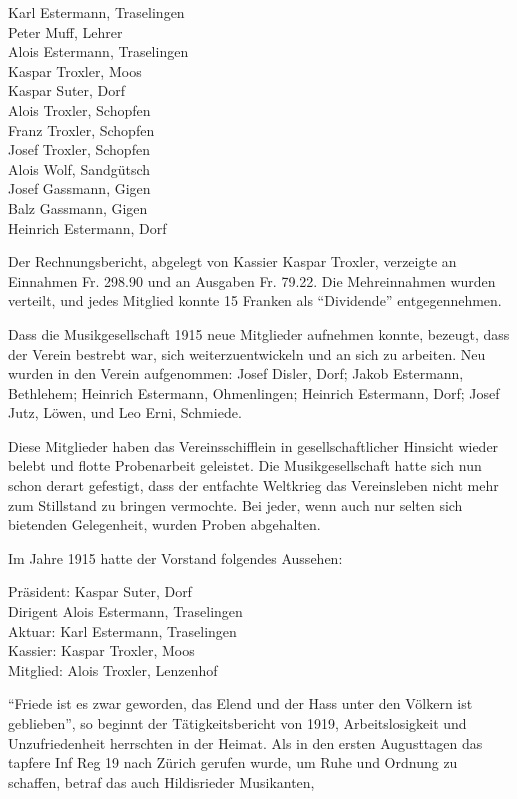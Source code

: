 \begin{history}
    \noindent
    Karl Estermann, Traselingen\\
    Peter Muff, Lehrer\\
    Alois Estermann, Traselingen\\
    Kaspar Troxler, Moos\\
    Kaspar Suter, Dorf\\
    Alois Troxler, Schopfen\\
    Franz Troxler, Schopfen\\
    Josef Troxler, Schopfen\\
    Alois Wolf, Sandgütsch\\
    Josef Gassmann, Gigen\\
    Balz Gassmann, Gigen\\
    Heinrich Estermann, Dorf

    Der Rechnungsbericht, abgelegt von Kassier Kaspar Troxler, verzeigte an
    Einnahmen Fr. 298.90 und an Ausgaben Fr. 79.22. Die Mehreinnahmen wurden
    verteilt, und jedes Mitglied konnte 15 Franken als \enquote{Dividende}
    entgegennehmen.

    Dass die Musikgesellschaft 1915 neue Mitglieder aufnehmen konnte, bezeugt,
    dass der Verein bestrebt war, sich weiterzuentwickeln und an sich zu
    arbeiten. Neu wurden in den Verein aufgenommen: Josef Disler, Dorf; Jakob
    Estermann, Bethlehem; Heinrich Estermann, Ohmenlingen; Heinrich
    Estermann, Dorf; Josef Jutz, Löwen, und Leo Erni, Schmiede.

    Diese Mitglieder haben das Vereinsschifflein in gesellschaftlicher Hinsicht
    wieder belebt und flotte Probenarbeit geleistet. Die Musikgesellschaft hatte
    sich nun schon derart gefestigt, dass der entfachte Weltkrieg das
    Vereinsleben nicht mehr zum Stillstand zu bringen vermochte. Bei jeder, wenn
    auch nur selten sich bietenden Gelegenheit, wurden Proben abgehalten.

    Im Jahre 1915 hatte der Vorstand folgendes Aussehen:

    \noindent
    Präsident: Kaspar Suter, Dorf\\
    Dirigent Alois Estermann, Traselingen\\
    Aktuar: Karl Estermann, Traselingen\\
    Kassier: Kaspar Troxler, Moos\\
    Mitglied: Alois Troxler, Lenzenhof

    \enquote{Friede ist es zwar geworden, das Elend und der Hass unter den Völkern ist
        geblieben}, so beginnt der Tätigkeitsbericht von 1919, Arbeitslosigkeit und
    Unzufriedenheit herrschten in der Heimat. Als in den ersten Augusttagen das
    tapfere Inf Reg 19 nach Zürich gerufen wurde, um Ruhe und Ordnung zu
    schaffen, betraf das auch Hildisrieder Musikanten,


\end{history}
